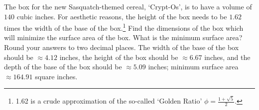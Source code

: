 {The box for the new Sasquatch-themed cereal, `Crypt-Os', is to have a volume of $140$ cubic inches.  For aesthetic reasons, the height of the box needs to be $1.62$ times the width of the base of the box.\footnote{1.62 is a crude approximation of the so-called `Golden Ratio' $\phi = \frac{1 + \sqrt{5}}{2}$.}  Find the dimensions of the box which will minimize the surface area of the box.  What is the minimum surface area?  Round your answers to two decimal places. }
{The width of the base of the box should be $\approx 4.12$ inches, the height of the box should be $\approx 6.67$ inches, and the depth of the base of the box should be $\approx 5.09$ inches;  minimum surface area $\approx 164.91$ square inches.
}